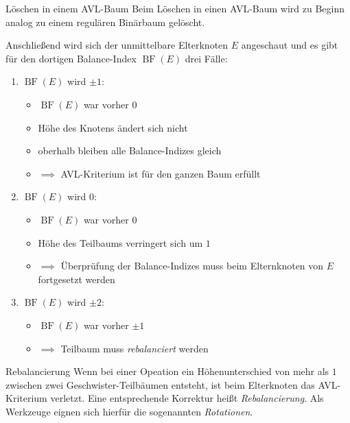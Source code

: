 \documentclass[german]{../spicker}
\newcommand{\BF}{\operatorname{BF}}
\begin{document}
\begin{algo}{Löschen in einem AVL-Baum}
    Beim Löschen in einen AVL-Baum wird zu Beginn analog zu einem regulären Binärbaum gelöscht.

    Anschließend wird sich der unmittelbare Elterknoten $E$ angeschaut und es gibt für den dortigen Balance-Index $\BF(E)$ drei Fälle:
    \begin{enumerate}
        \item $\BF(E)$ wird $\pm 1$:
              \begin{itemize}[-]
                  \item $\BF(E)$ war vorher $0$
                  \item Höhe des Knotens ändert sich nicht
                  \item oberhalb bleiben alle Balance-Indizes gleich
                  \item $\implies$ AVL-Kriterium ist für den ganzen Baum erfüllt
              \end{itemize}
        \item $\BF(E)$ wird $0$:
              \begin{itemize}[-]
                  \item $\BF(E)$ war vorher $0$
                  \item Höhe des Teilbaums verringert sich um $1$
                  \item $\implies$ Überprüfung der Balance-Indizes muss beim Elternknoten von $E$ fortgesetzt werden
              \end{itemize}
        \item $\BF(E)$ wird $\pm 2$:
              \begin{itemize}[-]
                  \item $\BF(E)$ war vorher $\pm 1$
                  \item $\implies$ Teilbaum muss \emph{rebalanciert} werden
              \end{itemize}
    \end{enumerate}
\end{algo}

\begin{algo}{Rebalancierung}
    Wenn bei einer Opeation ein Höhenunterschied von mehr als $1$ zwischen zwei Geschwister-Teilbäumen entsteht, ist beim Elterknoten das AVL-Kriterium verletzt.
    Eine entsprechende Korrektur heißt \emph{Rebalancierung}.
    Als Werkzeuge eignen sich hierfür die sogenannten \emph{Rotationen}.
\end{algo}
\end{document}
